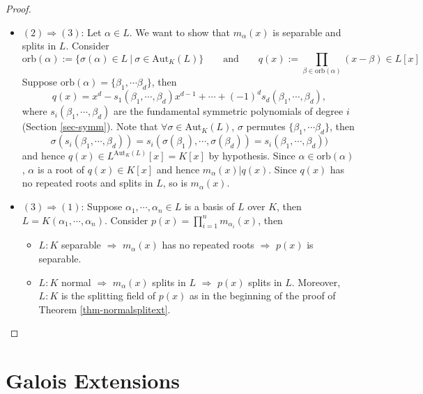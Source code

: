 \documentclass[11pt]{book}
\begin{document}
\begin{proof}
\begin{itemize}
        \item $(2)\Rightarrow (3)$: Let $\alpha \in L $. We want to show that $m_{\alpha}(x) $ is separable and splits in $L$. Consider 
        $$\mathrm{orb}(\alpha):=\{\sigma(\alpha) \in L\ |\ \sigma \in \mathrm{Aut}_K(L)\}  \quad \quad \mathrm{  and  } \quad \quad q(x):= \prod_{\beta \in \mathrm{orb}(\alpha)} (x-\beta) \in L[x]$$
        Suppose $\mathrm{orb}(\alpha)=\{\beta_1,\cdots \beta_d\}$, then 
        $$q(x)=x^d-s_1(\beta_1,\cdots,\beta_d)x^{d-1}+\cdots+(-1)^ds_d(\beta_1 ,\cdots, \beta_d),$$ 
        where $s_i(\beta_1,\cdots,\beta_d)$ are the fundamental symmetric polynomials of degree $i$ (Section \ref{sec-symm}). Note that $\forall \sigma \in \mathrm{Aut}_K(L)$, $\sigma$ permutes $\{\beta_1,\cdots \beta_d\}$, then $$\sigma(s_i(\beta_1,\cdots,\beta_d)) = s_i(\sigma(\beta_1),\cdots,\sigma(\beta_d)) = s_i(\beta_1,\cdots,\beta_d))$$and hence $q(x) \in L^{\mathrm{Aut}_K(L)}[x]=K[x]$ by hypothesis. Since $\alpha \in \mathrm{orb}(\alpha)$, $\alpha$ is a root of $q(x) \in K[x]$ and hence $m_{\alpha}(x) | q(x)$. 
        Since $q(x)$ has no repeated roots and splits in $L$, so is $m_{\alpha}(x)$.
        
        \item $(3)\Rightarrow (1)$: Suppose $\alpha_1,\cdots,\alpha_n \in L$ is a basis of $L$ over $K$, then $L=K(\alpha_1,\cdots,\alpha_n)$. Consider $p(x)=\prod_{i=1}^n m_{\alpha_i}(x)$, then
        \begin{itemize}
            \item $L:K$ separable $\Rightarrow$ $m_{\alpha}(x)$ has no repeated roots $\Rightarrow$ $p(x)$ is separable.
            \item $L:K$ normal $\Rightarrow$ $m_{\alpha}(x)$ splits in $L$ $\Rightarrow$ $p(x)$ splits in $L$. Moreover, $L:K$ is the splitting field of $p(x)$ as in the beginning of the proof of Theorem \ref{thm-normalsplitext}. 
        \end{itemize}
    \end{itemize}
\end{proof}




\chapter{Galois Extensions}
\end{document}
